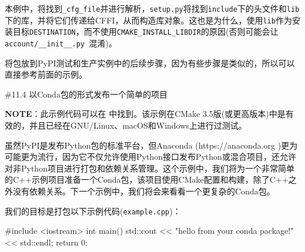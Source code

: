本例中，将找到\texttt{\_cfg\_file}并进行解析，\texttt{setup.py}将找到\texttt{include}下的头文件和\texttt{lib}下的库，并将它们传递给CFFI，从而构造库对象。这也是为什么，使用\texttt{lib}作为安装目标\texttt{DESTINATION}，而不使用\texttt{CMAKE\_INSTALL\_LIBDIR}的原因(否则可能会让\texttt{account/\_\_init\_\_.py }混淆)。


将包放到PyPI测试和生产实例中的后续步骤，因为有些步骤是类似的，所以可以直接参考前面的示例。


\#11.4 以Conda包的形式发布一个简单的项目

\begin{myInfoBox}
\textbf{NOTE}：此示例代码可以在  中找到。该示例在CMake 3.5版(或更高版本)中是有效的，并且已经在GNU/Linux、macOS和Windows上进行过测试。
\end{myInfoBox}

虽然PyPI是发布Python包的标准平台，但Anaconda (https://anaconda.org )更为可能更为流行，因为它不仅允许使用Python接口发布Python或混合项目，还允许对非Python项目进行打包和依赖关系管理。这个示例中，我们将为一个非常简单的C++示例项目准备一个Conda包，该项目使用CMake配置和构建，除了C++之外没有依赖关系。下一个示例中，我们将会来看看一个更复杂的Conda包。


我们的目标是打包以下示例代码(\texttt{example.cpp})：

\begin{codebox}[cpp]
#include <iostream>
int main() {
    std::cout << "hello from your conda package!" << std::endl;
    return 0;
}
\end{codebox}


